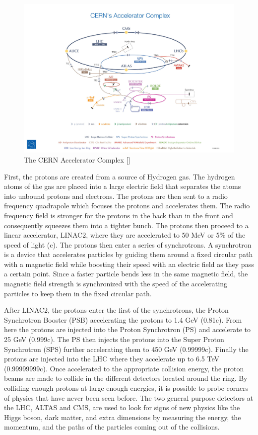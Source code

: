 \begin{figure}[h!]
  \centering
  \includegraphics[width=6in]{images/cern_accel_complex.png}
  \caption
   {The CERN Accelerator Complex [\cite{cernaccelcomplex}]}
  \label{fig:cernaccel}
\end{figure}

First, the protons are created from a source of Hydrogen gas. The hydrogen atoms of the gas are placed into a large electric field that separates the atoms into unbound protons and electrons. The protons are then sent to a radio frequency quadrapole which focuses the protons and accelerates them. The radio frequency field is stronger for the protons in the back than in the front and consequently squeezes them into a tighter bunch. The protons then proceed to a linear accelerator, LINAC2, where they are accelerated to 50 MeV or 5\% of the speed of light (c). The protons then enter a series of synchrotrons. A synchrotron is a device that accelerates particles by guiding them around a fixed circular path with a magnetic field while boosting their speed with an electric field as they pass a certain point. Since a faster particle bends less in the same magnetic field, the magnetic field strength is synchronized with the speed of the accelerating particles to keep them in the fixed circular path. 

After LINAC2, the protons enter the first of the synchrotrons, the Proton Synchrotron Booster (PSB) accelerating the protons to 1.4 GeV (0.81c). From here the protons are injected into the Proton Synchrotron (PS) and accelerate to 25 GeV (0.999c). The PS then injects the protons into the Super Proton Synchrotron (SPS) further accelerating them to 450 GeV (0.99999c). Finally the protons are injected into the LHC where they accelerate up to 6.5 TeV (0.99999999c). Once accelerated to the appropriate collision energy, the proton beams are made to collide in the different detectors located around the ring. By colliding enough protons at large enough energies, it is possible to probe corners of physics that have never been seen before. The two general purpose detectors at the LHC, ALTAS and CMS, are used to look for signs of new physics like the Higgs boson, dark matter, and extra dimensions by measuring the energy, the momentum, and the paths of the particles coming out of the collisions.

